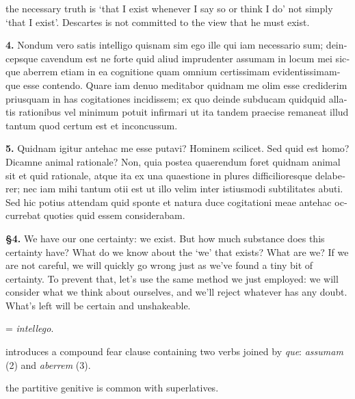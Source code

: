  the necessary truth is `that I exist whenever I say so or think I do' not simply `that I exist'. Descartes is not committed to the view that he must exist.

\clearpage

\beginnumbering
\pstart
\begin{latin}
    \textenglish{\textbf{4.}} Nondum vero satis intelligo quisnam sim ego ille qui iam necessario sum; deincepsque cavendum est ne forte quid aliud imprudenter assumam in locum mei sicque aberrem etiam in ea cognitione quam omnium certissimam evidentissimamque esse contendo. Quare iam denuo meditabor quidnam me olim esse crediderim priusquam in has cogitationes incidissem; ex quo deinde subducam quidquid allatis rationibus vel minimum potuit infirmari ut ita tandem praecise remaneat illud tantum quod certum est et inconcussum.
\end{latin}
\pend
\endnumbering

\beginnumbering
\pstart
\begin{latin}
    \textenglish{\textbf{5.}} Quidnam igitur antehac me esse putavi? Hominem scilicet. Sed quid est homo? Dicamne animal rationale? Non, quia postea quaerendum foret quidnam animal sit et quid rationale, atque ita ex una quaestione in plures difficilioresque delaberer; nec iam mihi tantum otii est ut illo velim inter istiusmodi subtilitates abuti. Sed hic potius attendam quid sponte  et natura duce cogitationi meae antehac occurrebat quoties quid essem considerabam.
\end{latin}
\pend
\endnumbering

\prenotes

\textbf{§4.} We have our one certainty: we exist. But how much substance does this certainty have? What do we know about the `we' that exists? What are we? If we are not careful, we will quickly go wrong just as we've found a tiny bit of certainty. To prevent that, let's use the same method we just employed: we will consider what we think about ourselves, and we'll reject whatever has any doubt. What's left will be certain and unshakeable.

 = \textit{intellego}.

 introduces a compound fear clause containing two verbs joined by \textit{que}: \textit{assumam} (2) and \textit{aberrem} (3).

 the partitive genitive is common with superlatives.

